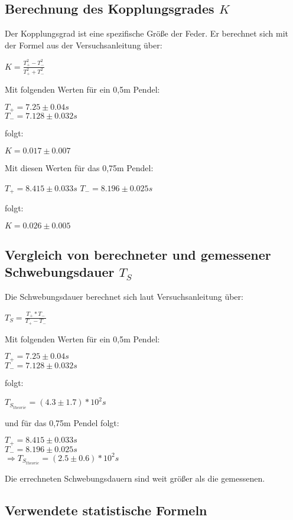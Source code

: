 \subsection{Berechnung des Kopplungsgrades $K$}
Der Kopplungsgrad ist eine spezifische Größe der Feder.
Er berechnet sich mit der Formel aus der Versuchsanleitung
über:
\begin{center}
  $K=\frac{T^2_+-T^2_-}{T^2_++T^2_-}$
\end{center}
Mit folgenden Werten für ein 0,5m Pendel:
\begin{center}
  $T_+=7.25\pm0.04s$\\
  $T_-=7.128\pm0.032s$
\end{center}
folgt:
\begin{center}
  $K=0.017\pm0.007$
\end{center}
Mit diesen Werten für das 0,75m Pendel:
\begin{center}
  $T_+=8.415\pm0.033s$
  $T_-=8.196\pm0.025s$
\end{center}
folgt:
\begin{center}
  $K=0.026\pm0.005$
\end{center}

\subsection{Vergleich von berechneter und gemessener Schwebungsdauer $T_S$}
Die Schwebungsdauer berechnet sich laut Versuchsanleitung über:
\begin{center}
  $T_S=\frac{T_+*T_-}{T_+-T_-}$
\end{center}
Mit folgenden Werten für ein 0,5m Pendel:
\begin{center}
  $T_+=7.25\pm0.04s$\\
  $T_-=7.128\pm0.032s$
\end{center}
folgt:
\begin{center}
  $T_{S_{theorie}}=(4.3\pm1.7)*10^2s$
\end{center}
und für das 0,75m Pendel folgt:
\begin{center}
  $T_+=8.415\pm0.033s$\\
  $T_-=8.196\pm0.025s$\\
  $\Rightarrow T_{S_{theorie}}=(2.5\pm0.6)*10^2s$
\end{center}
Die errechneten Schwebungsdauern sind weit größer als die
gemessenen.

\subsection{Verwendete statistische Formeln}

